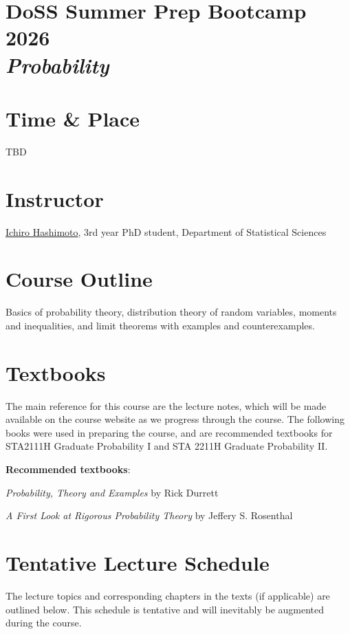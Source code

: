\documentclass[12pt]{article}
\date{ }
\begin{document}
\section*{DoSS Summer Prep Bootcamp 2026 \\  {\it{Probability}}}

\section{Time \& Place}
TBD

\section{Instructor}
\href{your webpage}{Ichiro Hashimoto}, 3rd year PhD student, Department of Statistical Sciences



\section{Course Outline}

Basics of probability theory, distribution theory of random variables, moments and inequalities, and limit theorems with examples and counterexamples.

\section{Textbooks}

The main reference for this course are the lecture notes, which will be made available on the course website as we progress through the course. The following books were used in preparing the course, and are recommended textbooks for STA2111H Graduate Probability I and STA 2211H Graduate Probability II. 

\vspace{1.0cm}

{\bf{Recommended textbooks}}:
\vspace{0.1cm}
\noindent

{\emph{Probability, Theory and Examples}} by Rick Durrett

{\emph{A First Look at Rigorous Probability Theory}} by Jeffery S. Rosenthal

\newpage
\section{Tentative Lecture Schedule}
The lecture topics and corresponding chapters in the texts (if applicable) are outlined below.  This schedule is tentative and will inevitably be augmented during the course.  
\end{document}
